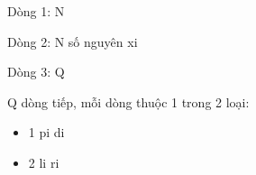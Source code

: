 Dòng 1: N

Dòng 2: N số nguyên xi

Dòng 3: Q

Q dòng tiếp, mỗi dòng thuộc 1 trong 2 loại:
\begin{itemize}
	\item 1 pi di
	\item 2 li ri
\end{itemize}